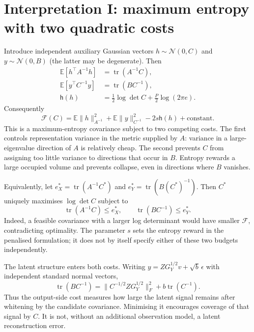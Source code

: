 \documentclass[11pt,a4paper]{article}
\newcommand{\tr}{\operatorname{tr}}
\newcommand{\E}{\mathbb E}
\newcommand{\N}{\mathcal N}
\newcommand{\F}{\mathcal F}
\begin{document}
\section{Interpretation I: maximum entropy with two quadratic costs}
Introduce independent auxiliary Gaussian vectors
$h\sim\N(0,C)$ and $y\sim\N(0,B)$ (the latter may be degenerate).
Then
\begin{align}
 \E[h^\top A^{-1}h]&=\tr(A^{-1}C),\\
 \E[y^\top C^{-1}y]&=\tr(BC^{-1}),\\
 \mathsf h(h)&=\tfrac12\log\det C+\tfrac P2\log(2\pi e).
\end{align}
Consequently
\begin{equation}\label{eq:entropy}
 \F(C)=\E\|h\|_{A^{-1}}^2+\E\|y\|_{C^{-1}}^2
 -2s\mathsf h(h)+\text{constant}.
\end{equation}
This is a maximum-entropy covariance subject to two competing costs.
The first controls representation variance in the metric supplied by $A$:
variance in a large-eigenvalue direction of $A$ is relatively cheap.
The second prevents $C$ from assigning too little variance to directions
that occur in $B$. Entropy rewards a large occupied volume and prevents
collapse, even in directions where $B$ vanishes.

Equivalently, let $e_X^*=\tr(A^{-1}C^*)$ and
$e_Y^*=\tr(B(C^*)^{-1})$. Then $C^*$ uniquely maximises
$\log\det C$ subject to
\begin{equation}
 \tr(A^{-1}C)\le e_X^*,\qquad \tr(BC^{-1})\le e_Y^*.
\end{equation}
Indeed, a feasible covariance with a larger log determinant would have
smaller $\F$, contradicting optimality. The parameter $s$ sets the
entropy reward in the penalised formulation; it does not by itself specify
either of these two budgets independently.

The latent structure enters both costs. Writing
$y=ZG_Y^{1/2}v+\sqrt b\,\epsilon$ with independent standard normal vectors,
\begin{equation}\label{eq:Ytrace}
 \tr(BC^{-1})=
 \|C^{-1/2}ZG_Y^{1/2}\|_F^2+b\tr(C^{-1}).
\end{equation}
Thus the output-side cost measures how large the latent signal remains
after whitening by the candidate covariance. Minimising it encourages
coverage of that signal by $C$. It is not, without an additional observation
model, a latent reconstruction error.
\end{document}
